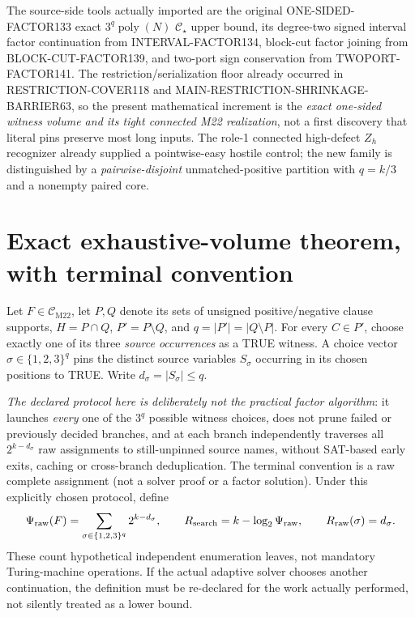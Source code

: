 \documentclass[11pt]{article}
\newcommand{\CM}{\mathcal C_{\mathrm{M22}}}
\newcommand{\CS}{\mathcal C_\star}
\begin{document}
The source-side tools actually imported are the original ONE-SIDED-FACTOR133 exact \(3^q\operatorname{poly}(N)\) \(\CS\) upper bound, its degree-two signed interval factor continuation from INTERVAL-FACTOR134, block-cut factor joining from BLOCK-CUT-FACTOR139, and two-port sign conservation from TWOPORT-FACTOR141. The restriction/serialization floor already occurred in RESTRICTION-COVER118 and MAIN-RESTRICTION-SHRINKAGE-BARRIER63, so the present mathematical increment is the \emph{exact one-sided witness volume and its tight connected M22 realization}, not a first discovery that literal pins preserve most long inputs. The role-1 connected high-defect \(Z_h\) recognizer already supplied a pointwise-easy hostile control; the new family is distinguished by a \emph{pairwise-disjoint} unmatched-positive partition with \(q=k/3\) and a nonempty paired core.

\section{Exact exhaustive-volume theorem, with terminal convention}
Let \(F\in\CM\), let \(P,Q\) denote its sets of unsigned positive/negative clause supports, \(H=P\cap Q\), \(P'=P\setminus Q\), and \(q=|P'|=|Q\setminus P|\). For every \(C\in P'\), choose exactly one of its three \emph{source occurrences} as a TRUE witness. A choice vector \(\sigma\in\{1,2,3\}^{q}\) pins the distinct source variables \(S_\sigma\) occurring in its chosen positions to TRUE. Write \(d_\sigma=|S_\sigma|\le q\).

\emph{The declared protocol here is deliberately not the practical factor algorithm}: it launches \emph{every} one of the \(3^q\) possible witness choices, does not prune failed or previously decided branches, and at each branch independently traverses all \(2^{k-d_\sigma}\) raw assignments to still-unpinned source names, without SAT-based early exits, caching or cross-branch deduplication. The terminal convention is a raw complete assignment (not a solver proof or a factor solution). Under this explicitly chosen protocol, define
\[
\Psi_{\rm raw}(F)=\sum_{\sigma\in\{1,2,3\}^q}2^{k-d_\sigma},\qquad
R_{\rm search}=k-\log_2\Psi_{\rm raw},\qquad
R_{\rm raw}(\sigma)=d_\sigma.
\]
These count hypothetical independent enumeration leaves, not mandatory Turing-machine operations. If the actual adaptive solver chooses another continuation, the definition must be re-declared for the work actually performed, not silently treated as a lower bound.
\end{document}

